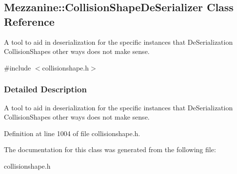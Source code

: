 \hypertarget{classMezzanine_1_1CollisionShapeDeSerializer}{
\subsection{Mezzanine::CollisionShapeDeSerializer Class Reference}
\label{classMezzanine_1_1CollisionShapeDeSerializer}
}


A tool to aid in deserialization for the specific instances that DeSerialization CollisionShapes other ways does not make sense.  




{\ttfamily \#include $<$collisionshape.h$>$}



\subsubsection{Detailed Description}
A tool to aid in deserialization for the specific instances that DeSerialization CollisionShapes other ways does not make sense. 

Definition at line 1004 of file collisionshape.h.



The documentation for this class was generated from the following file:\begin{DoxyCompactItemize}
\item 
collisionshape.h\end{DoxyCompactItemize}
